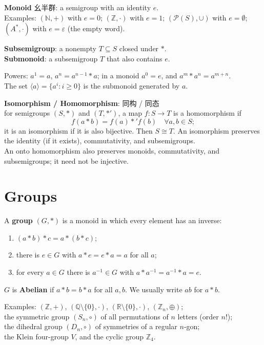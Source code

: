 \documentclass[12pt, a4paper, UTF8, openany]{ctexbook}
\newcommand{\field}[1]{\mathbb{#1}}%
\begin{document}
        \textbf{Monoid} 幺半群: a semigroup with an identity $e$. \\
        Examples: $(\field{N}, +)$ with $e = 0$; $(\field{Z}, \cdot)$ with $e = 1$; $(\mathcal{P}(S), \cup)$ with $e = \emptyset$; $(A^*, \cdot)$ with $e = \varepsilon$ (the empty word).

        \textbf{Subsemigroup}: a nonempty $T \subseteq S$ closed under $*$. \\
        \textbf{Submonoid}: a subsemigroup $T$ that also contains $e$.

        Powers: $a^1 = a$, $a^n = a^{n-1} * a$; in a monoid $a^0 = e$, and $a^m * a^n = a^{m+n}$. \\
        The set $\langle a \rangle = \{a^i : i \geqslant 0\}$ is the submonoid generated by $a$.

        \textbf{Isomorphism / Homomorphism}: 同构 / 同态\\
        for semigroups $(S, *)$ and $(T, *')$, a map $f: S \to T$ is a homomorphism if
        $$ f(a * b) = f(a) *' f(b) \quad \forall a, b \in S; $$
        it is an isomorphism if it is also bijective. Then $S \cong T$.
        An isomorphism preserves the identity (if it exists), commutativity, and subsemigroups. \\
        An onto homomorphism also preserves monoids, commutativity, and subsemigroups; it need not be injective.

    \section{Groups}
        A \textbf{group} $(G, *)$ is a monoid in which every element has an inverse:
        \begin{enumerate}
            \item $(a * b) * c = a * (b * c)$;
            \item there is $e \in G$ with $a * e = e * a = a$ for all $a$;
            \item for every $a \in G$ there is $a^{-1} \in G$ with $a * a^{-1} = a^{-1} * a = e$.
        \end{enumerate}
        $G$ is \textbf{Abelian} if $a * b = b * a$ for all $a, b$. We usually write $ab$ for $a * b$.

        Examples: $(\field{Z}, +)$, $(\field{Q} \setminus \{0\}, \cdot)$, $(\field{R} \setminus \{0\}, \cdot)$, $(\field{Z}_n, \oplus)$; \\
        the symmetric group $(S_n, \circ)$ of all permutations of $n$ letters (order $n!$); \\
        the dihedral group $(D_n, \circ)$ of symmetries of a regular $n$-gon; \\
        the Klein four-group $V$, and the cyclic group $\field{Z}_4$.
\end{document}
